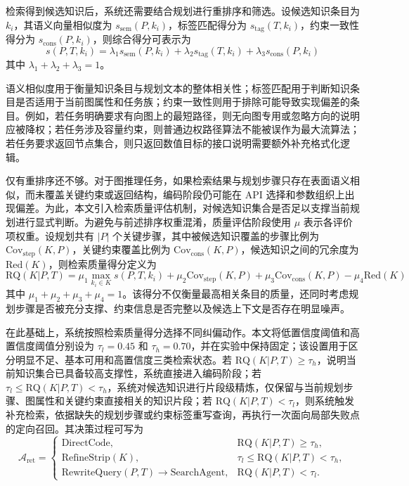 检索得到候选知识后，系统还需要结合规划进行重排序和筛选。设候选知识条目为 $k_i$，其语义向量相似度为 $s_{\mathrm{sem}}(P,k_i)$，标签匹配得分为 $s_{\mathrm{tag}}(T,k_i)$，约束一致性得分为 $s_{\mathrm{cons}}(P,k_i)$，则综合得分可表示为
\begin{equation}
s(P,T,k_i)=\lambda_1 s_{\mathrm{sem}}(P,k_i)+\lambda_2 s_{\mathrm{tag}}(T,k_i)+\lambda_3 s_{\mathrm{cons}}(P,k_i)
\end{equation}
其中 $\lambda_1+\lambda_2+\lambda_3=1$。

语义相似度用于衡量知识条目与规划文本的整体相关性；标签匹配用于判断知识条目是否适用于当前图属性和任务族；约束一致性则用于排除可能导致实现偏差的条目。例如，若任务明确要求有向图上的最短路径，则无向图专用或忽略方向的说明应被降权；若任务涉及容量约束，则普通边权路径算法不能被误作为最大流算法；若任务要求返回节点集合，则只返回数值目标的接口说明需要额外补充格式化逻辑。

仅有重排序还不够。对于图推理任务，如果检索结果与规划步骤只存在表面语义相似，而未覆盖关键约束或返回结构，编码阶段仍可能在 API 选择和参数组织上出现偏差。为此，本文引入检索质量评估机制，对候选知识集合是否足以支撑当前规划进行显式判断。为避免与前述排序权重混淆，质量评估阶段使用 $\mu$ 表示各评价项权重。设规划共有 $|P|$ 个关键步骤，其中被候选知识覆盖的步骤比例为 $\mathrm{Cov}_{\mathrm{step}}(K,P)$，关键约束覆盖比例为 $\mathrm{Cov}_{\mathrm{cons}}(K,P)$，候选知识之间的冗余度为 $\mathrm{Red}(K)$，则检索质量得分定义为
\begin{equation}
\mathrm{RQ}(K|P,T)=\mu_1 \max_{k_i \in K} s(P,T,k_i)+\mu_2 \mathrm{Cov}_{\mathrm{step}}(K,P)+\mu_3 \mathrm{Cov}_{\mathrm{cons}}(K,P)-\mu_4 \mathrm{Red}(K)
\end{equation}
其中 $\mu_1+\mu_2+\mu_3+\mu_4=1$。该得分不仅衡量最高相关条目的质量，还同时考虑规划步骤是否被充分支撑、约束信息是否完整以及候选上下文是否存在明显噪声。

在此基础上，系统按照检索质量得分选择不同纠偏动作。本文将低置信度阈值和高置信度阈值分别设为 $\tau_l=0.45$ 和 $\tau_h=0.70$，并在实验中保持固定；该设置用于区分明显不足、基本可用和高置信度三类检索状态。若 $\mathrm{RQ}(K|P,T)\ge \tau_h$，说明当前知识集合已具备较高支撑性，系统直接进入编码阶段；若 $\tau_l \le \mathrm{RQ}(K|P,T)<\tau_h$，系统对候选知识进行片段级精炼，仅保留与当前规划步骤、图属性和关键约束直接相关的知识片段；若 $\mathrm{RQ}(K|P,T)<\tau_l$，则系统触发补充检索，依据缺失的规划步骤或约束标签重写查询，再执行一次面向局部失败点的定向召回。其决策过程可写为
\begin{equation}
\mathcal{A}_{\mathrm{ret}}=
\begin{cases}
\text{DirectCode}, & \mathrm{RQ}(K|P,T)\ge \tau_h,\\
\text{RefineStrip}(K), & \tau_l \le \mathrm{RQ}(K|P,T)<\tau_h,\\
\text{RewriteQuery}(P,T)\rightarrow \text{SearchAgent}, & \mathrm{RQ}(K|P,T)<\tau_l.
\end{cases}
\end{equation}

